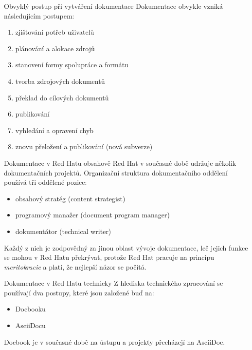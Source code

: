 \documentclass[12pt,a4paper]{beamer}
\begin{document}
	\begin{frame}{Obvyklý postup při vytváření dokumentace}
	Dokumentace obvykle vzniká následujícím postupem:
			\begin{enumerate}
				\item zjišťování potřeb uživatelů
				\item plánování a alokace zdrojů
				\item stanovení formy spolupráce a formátu
				\item tvorba zdrojových dokumentů
				\item překlad do cílových dokumentů
				\item publikování
				\item vyhledání a opravení chyb
				\item znovu přeložení a publikování (nová subverze)
			\end{enumerate}
	\end{frame}

\begin{frame}{Dokumentace v Red Hatu obsahově}
Red Hat v současné době udržuje několik dokumentačních projektů. Organizační struktura dokumentačního oddělení používá tři oddělené pozice:

\begin{itemize}
	\item obsahový stratég (content strategist)
	\item programový manažer (document program manager)
	\item dokumentátor (technical writer)
\end{itemize}

Každý z nich je zodpovědný za jinou oblast vývoje dokumentace, leč jejich funkce se mohou v Red Hatu překrývat, protože Red Hat pracuje na principu \textit{meritokracie} a platí, že nejlepší názor se počítá. 
\end{frame}


	\begin{frame}{Dokumentace v Red Hatu technicky}
		Z hlediska technického zpracování se používají dva postupy, které jsou založené buď na:
		
		\begin{itemize}
			\item Docbooku
			\item AsciiDocu
		\end{itemize}
	
		Docbook je v současné době na ústupu a projekty přecházejí na AsciiDoc.
	\end{frame}
\end{document}
